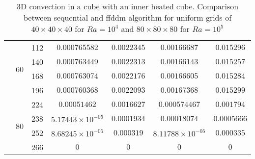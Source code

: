 \begin{table}[!h]
\begin{center}
\begin{tabular}{|*{7}{c|}}
			 & \multirow{4}{*}{60} & 112 & $0.000765582$ & $0.0022345$ & $ 0.00166687 $ & $0.015296$ \\%
			\cline{3-7}
			& & 140 & $0.000763449$ & $0.0022313$ & $ 0.00166143 $ & $0.015257$ \\ \cline{3-7} %
			& & 168 & $0.000763074$ & $0.0022176$ & $ 0.00166605 $ & $0.015284$  \\ \cline{3-7} %
			& & 196 & $0.000760368$ & $0.0022093$ & $ 0.00167368 $ & $0.015299$ \\ \cline{2-7} 
			 & \multirow{4}{*}{80} & 224 & $0.00051462$ & $0.0016627$ & $ 0.000574467 $ & $0.001794$ \\%
			\cline{3-7}
			& & 238 & $5.17443 \times 10^{-05}$ & $0.0001934$ & $ 0.00018074 $ & $0.0005666$ \\ \cline{3-7} %
			& & 252 & $8.68245 \times 10^{-05}$ & $0.000319$ & $ 8.11788 \times 10^{-05} $ & $0.000335$  \\ \cline{3-7} %
			& & 266 & $0$ & $0$ & $ 0 $ & $0$ \\ \hline 

		\end{tabular}
	\end{center}
	\caption {3D convection in a cube with an inner heated cube. Comparison between sequential and ffddm algorithm for uniform grids of $40 \times 40 \times 40$ for $Ra = 10^4$ and $80 \times 80 \times 80$ for $Ra = 10^5$}
	\label{tab-T2}
\end{table}
